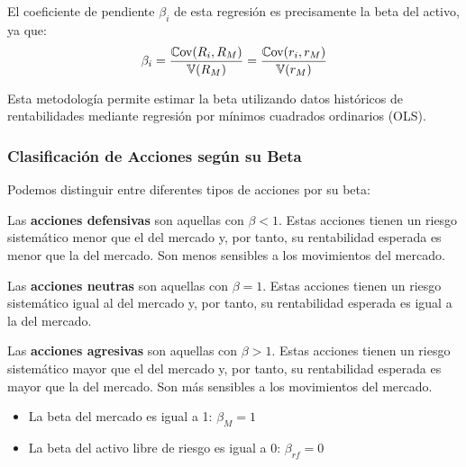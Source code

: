 El coeficiente de pendiente $\beta_i$ de esta regresión es precisamente la beta del activo, ya que:
\begin{equation}
\beta_i = \frac{\mathbb{C}\text{ov}(R_i, R_M)}{\mathbb{V}(R_M)} = \frac{\mathbb{C}\text{ov}(r_i, r_M)}{\mathbb{V}(r_M)}
\end{equation}

Esta metodología permite estimar la beta utilizando datos históricos de rentabilidades mediante regresión por mínimos cuadrados ordinarios (OLS).

\subsubsection{Clasificación de Acciones según su Beta}

Podemos distinguir entre diferentes tipos de acciones por su beta:

\begin{definicion}
Las \textbf{acciones defensivas} son aquellas con $\beta < 1$. Estas acciones tienen un riesgo sistemático menor que el del mercado y, por tanto, su rentabilidad esperada es menor que la del mercado. Son menos sensibles a los movimientos del mercado.
\end{definicion}

\begin{definicion}
Las \textbf{acciones neutras} son aquellas con $\beta = 1$. Estas acciones tienen un riesgo sistemático igual al del mercado y, por tanto, su rentabilidad esperada es igual a la del mercado.
\end{definicion}

\begin{definicion}
Las \textbf{acciones agresivas} son aquellas con $\beta > 1$. Estas acciones tienen un riesgo sistemático mayor que el del mercado y, por tanto, su rentabilidad esperada es mayor que la del mercado. Son más sensibles a los movimientos del mercado.
\end{definicion}

\begin{proposicion}
\begin{itemize}
\item La beta del mercado es igual a 1: $\beta_M = 1$
\item La beta del activo libre de riesgo es igual a 0: $\beta_{rf} = 0$
\end{itemize}
\end{proposicion}

